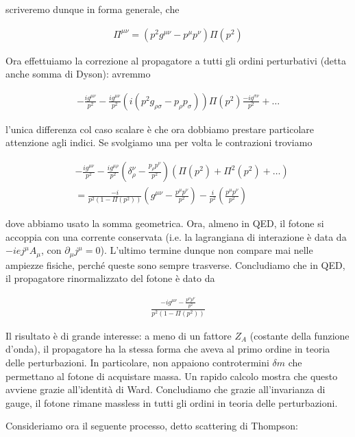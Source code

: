 \documentclass[11pt]{report}
\begin{document}
scriveremo dunque in forma generale, che 

\begin{align}
    \Pi^{\mu\nu} = (p^2g^{\mu\nu}-p^\mu p^\nu)\Pi(p^2)
\end{align}

Ora effettuiamo la correzione al propagatore a tutti gli ordini perturbativi (detta anche somma di Dyson): avremmo 

\begin{align}
    -\frac{ig^{\mu\nu}}{p^2} - \frac{ig^{\mu\nu}}{p^2}(i(p^2g_{\rho\sigma} - p_\rho p_\sigma))\Pi(p^2)\frac{-ig^{\sigma\nu}}{p^2} + \ldots  
\end{align}

l'unica differenza col caso scalare è che ora dobbiamo prestare particolare attenzione agli indici. Se svolgiamo una per volta le contrazioni troviamo 

\begin{align}
    &-\frac{ig^{\mu\nu}}{p^2} - \frac{ig^{\mu\rho}}{p^2}\left(\delta^\nu_\rho - \frac{p_\rho p^\nu}{p^2} \right)(\Pi(p^2)+\Pi^2(p^2) + \ldots) \\
    &= \frac{-i}{p^2(1-\Pi(p^2))}\left(g^{\mu\nu} - \frac{p^\mu p^\nu}{p^2} \right) - \frac{i}{p^2}\left(\frac{p^\mu p^\nu}{p^2} \right)
\end{align}

dove abbiamo usato la somma geometrica. Ora, almeno in QED, il fotone si accoppia con una corrente conservata (i.e. la lagrangiana di interazione è data da \(-iej^\mu A_\mu\), con \(\partial_\mu j^\mu = 0\)). L'ultimo termine dunque non compare mai nelle ampiezze fisiche, perché queste sono sempre trasverse. Concludiamo che in QED, il propagatore rinormalizzato del fotone è dato da 

\begin{align}
    \frac{-ig^{\mu\nu} - \frac{p^\mu p^\nu}{p^2}}{p^2(1-\Pi(p^2))}
\end{align}

Il risultato è di grande interesse: a meno di un fattore \(Z_A\) (costante della funzione d'onda), il propagatore ha la stessa forma che aveva al primo ordine in teoria delle perturbazioni. In particolare, non appaiono controtermini \(\delta m\) che permettano al fotone di acquistare massa. Un rapido calcolo mostra che questo avviene grazie all'identità di Ward. Concludiamo che grazie all'invarianza di gauge, il fotone rimane massless in tutti gli ordini in teoria delle perturbazioni. 

Consideriamo ora il seguente processo, detto scattering di Thompson: 
\end{document}
